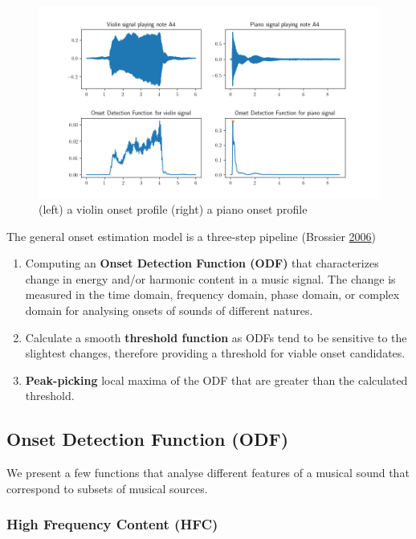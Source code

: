 \documentclass[american,]{article}
\providecommand{\tightlist}{%
  \setlength{\itemsep}{0pt}\setlength{\parskip}{0pt}}
\begin{document}
\begin{figure}
\centering
\includegraphics{img/plot/onset_profiles.png}
\caption{(left) a violin onset profile (right) a piano onset profile}
\end{figure}

The general onset estimation model is a three-step pipeline (Brossier \protect\hyperlink{ref-brossier}{2006})

\begin{enumerate}
\def\labelenumi{\arabic{enumi}.}
\tightlist
\item
  Computing an \textbf{Onset Detection Function (ODF)} that
  characterizes change in energy and/or harmonic content
  in a music signal.
  The change is measured in the time domain, frequency domain,
  phase domain, or complex domain for analysing onsets
  of sounds of different natures.
\item
  Calculate a smooth \textbf{threshold function} as ODFs
  tend to be sensitive to the slightest changes, therefore
  providing a threshold for viable onset candidates.
\item
  \textbf{Peak-picking} local maxima of the ODF that are
  greater than the calculated threshold.
\end{enumerate}

\hypertarget{onset-detection-function-odf}{%
\subsection{Onset Detection Function (ODF)}\label{onset-detection-function-odf}}

We present a few functions that analyse different features
of a musical sound that correspond to subsets of musical sources.

\hypertarget{high-frequency-content-hfc}{%
\subsubsection{High Frequency Content (HFC)}\label{high-frequency-content-hfc}}
\end{document}
